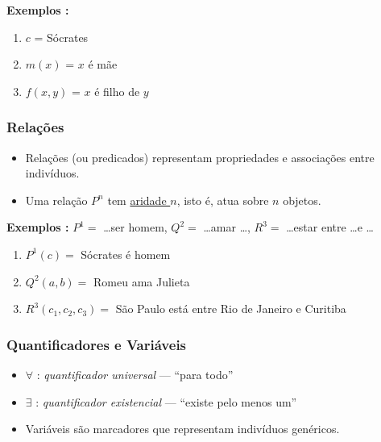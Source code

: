             \textbf{Exemplos :}
            \begin{enumerate}[left=0.5cm, align=left, nosep]
                \item $c$ = Sócrates 
                \item $m(x)$ = $x$ é mãe 
                \item $f(x,y)$ = $x$ é filho de $y$ 
            \end{enumerate}

        \subsubsection*{Relações}
            \begin{itemize}[left=0.5cm, align=left, nosep]
                \item Relações (ou predicados) representam propriedades e associações entre indivíduos.
                \item Uma relação $P^n$ tem \underline{aridade $n$}, isto é, atua sobre $n$ objetos.
            \end{itemize}
    
            \textbf{Exemplos :}
            $P^1 =$ \dots ser homem, $Q^2 =$ \dots amar \dots, $R^3 =$ \dots estar entre \dots e \dots
    
            \begin{enumerate}[left=0.5cm, align=left, nosep]
                \item $P^1(c) =$ Sócrates é homem
                \item $Q^2(a,b) =$ Romeu ama Julieta 
                \item $R^3(c_1,c_2,c_3) =$ São Paulo está entre Rio de Janeiro e Curitiba
            \end{enumerate} 

        \subsubsection*{Quantificadores e Variáveis}
            \begin{itemize}[left=0.5cm, align=left, nosep]
                \item $\forall$ : \textit{quantificador universal} — “para todo”
                \item $\exists$ : \textit{quantificador existencial} — “existe pelo menos um”
                \item Variáveis são marcadores que representam indivíduos genéricos.
            \end{itemize}

